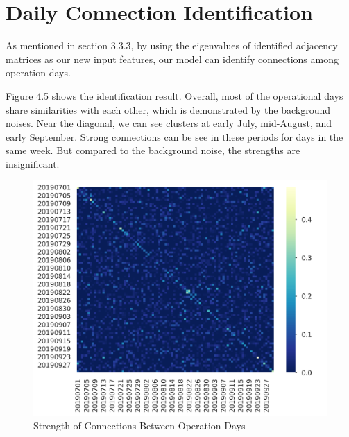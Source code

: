 \section{Daily Connection Identification}

As mentioned in section 3.3.3, by using the eigenvalues of identified adjacency matrices as our new input features, our model can identify connections among operation days. 

\hyperref[fig:4-5]{Figure 4.5} shows the identification result. Overall, most of the operational days share similarities with each other, which is demonstrated by the background noises. Near the diagonal, we can see clusters at early July, mid-August, and early September. Strong connections can be see in these periods for days in the same week. But compared to the background noise, the strengths are insignificant.

\begin{figure}[thbp]
    \centering
    \includegraphics[width=\textwidth]{img/daily_corr.png}
    \caption{Strength of Connections Between Operation Days}
    \label{fig:4-5}
\end{figure}

